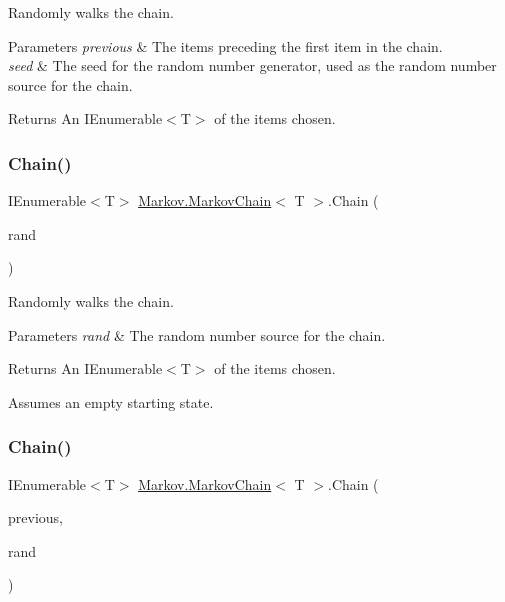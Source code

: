 Randomly walks the chain. 


\begin{DoxyParams}{Parameters}
{\em previous} & The items preceding the first item in the chain.\\
\hline
{\em seed} & The seed for the random number generator, used as the random number source for the chain.\\
\hline
\end{DoxyParams}
\begin{DoxyReturn}{Returns}
An I\+Enumerable$<$\+T$>$ of the items chosen.
\end{DoxyReturn}
\mbox{\label{class_markov_1_1_markov_chain_a5d82b8169c681429fe8705b83bcb381e}} 
\subsubsection{\texorpdfstring{Chain()}{Chain()}\hspace{0.1cm}{\footnotesize\ttfamily [5/6]}}
{\footnotesize\ttfamily I\+Enumerable$<$T$>$ \mbox{\hyperlink{class_markov_1_1_markov_chain}{Markov.\+Markov\+Chain}}$<$ T $>$.Chain (\begin{DoxyParamCaption}\item[{Random}]{rand }\end{DoxyParamCaption})}



Randomly walks the chain. 


\begin{DoxyParams}{Parameters}
{\em rand} & The random number source for the chain.\\
\hline
\end{DoxyParams}
\begin{DoxyReturn}{Returns}
An I\+Enumerable$<$\+T$>$ of the items chosen.
\end{DoxyReturn}


Assumes an empty starting state.\mbox{\label{class_markov_1_1_markov_chain_a380daf4363822c659489862de2154dc1}} 
\subsubsection{\texorpdfstring{Chain()}{Chain()}\hspace{0.1cm}{\footnotesize\ttfamily [6/6]}}
{\footnotesize\ttfamily I\+Enumerable$<$T$>$ \mbox{\hyperlink{class_markov_1_1_markov_chain}{Markov.\+Markov\+Chain}}$<$ T $>$.Chain (\begin{DoxyParamCaption}\item[{I\+Enumerable$<$ T $>$}]{previous,  }\item[{Random}]{rand }\end{DoxyParamCaption})}



